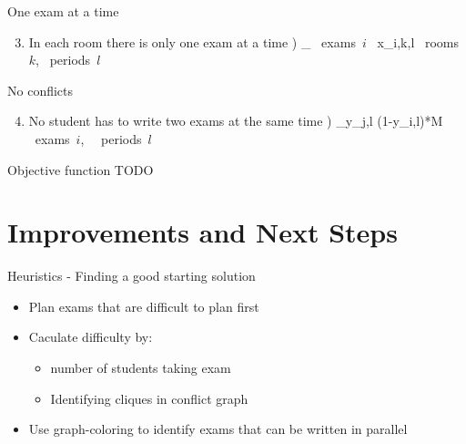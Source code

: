 \documentclass[10pt]{beamer}
\def\ba#1\ea{\begin{align*}#1\end{align*}}
\begin{document}
         \begin{frame}{One exam at a time}
         	\begin{enumerate}
         		\setcounter{enumi}{2}     
         		\item In each room there is only one exam at a time
         		\ba
         		(5) \;\;\;\; \sum_{ \forall \mbox{\small{ exams $i$ }}} x_{i,k,l}  \;\;\;\;\;\;\;\;\;  \forall \mbox{\small{ rooms $k$}}, \forall \mbox{\small{ periods $l$ }}
         		\ea
         	\end{enumerate}
         \end{frame}
        
        \begin{frame}{No conflicts}
        	\begin{enumerate}
        		\setcounter{enumi}{3}
        		\item No student has to write two exams at the same time
        		\ba
        		(6) \;\;\;\; \sum_{}y_{j,l}  \leq (1-y_{i,l})*M \;\;\;\;\;\;\;\; \forall \mbox{\small{ exams $i$, }}  \forall \mbox{\small{ periods $l$ }}
        		\ea
        	\end{enumerate}
        \end{frame}
        
        \begin{frame}{Objective function}
        		TODO
        \end{frame}
        
        \section{Improvements and Next Steps}
        
        \begin{frame}{Heuristics - Finding a good starting solution}
        	\begin{itemize}
        		\item Plan exams that are difficult to plan first
        		\item Caculate difficulty by:
        		\begin{itemize}
        			\item number of students taking exam
		        	\item Identifying cliques in conflict graph		        			
        		\end{itemize}
        		\item Use graph-coloring to identify exams that can be written in parallel
        		
        	\end{itemize}
        \end{frame}
        
\end{document}
